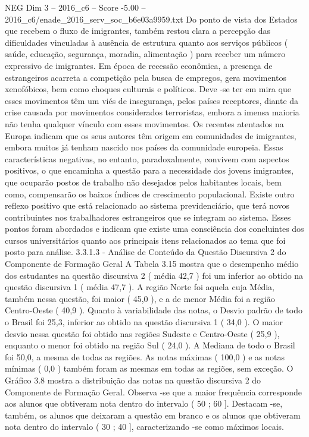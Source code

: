\begin{textsample}{NEG Dim 3 – 2016\_c6 – Score -5.00 – 2016\_c6/enade\_2016\_serv\_soc\_b6e03a9959.txt}
Do ponto de vista dos Estados que recebem o fluxo de imigrantes, também restou clara a percepção das dificuldades vinculadas à ausência de estrutura quanto aos serviços públicos ( saúde, educação, segurança, moradia, alimentação ) para receber um número expressivo de imigrantes.
Em época de recessão econômica, a presença de estrangeiros acarreta a competição pela busca de empregos, gera movimentos xenofóbicos, bem como choques culturais e políticos.
Deve -se ter em mira que esses movimentos têm um viés de insegurança, pelos países receptores, diante da crise causada por movimentos considerados terroristas, embora a imensa maioria não tenha qualquer vínculo com esses movimentos.
Os recentes atentados na Europa indicam que os seus autores têm origem em comunidades de imigrantes, embora muitos já tenham nascido nos países da comunidade europeia.
Essas características negativas, no entanto, paradoxalmente, convivem com aspectos positivos, o que encaminha a questão para a necessidade dos jovens imigrantes, que ocuparão postos de trabalho não desejados pelos habitantes locais, bem como, compensarão os baixos índices de crescimento populacional.
Existe outro reflexo positivo que está relacionado ao sistema previdenciário, que terá novos contribuintes nos trabalhadores estrangeiros que se integram ao sistema.
Esses pontos foram abordados e indicam que existe uma consciência dos concluintes dos cursos universitários quanto aos principais itens relacionados ao tema que foi posto para análise. 3.3.1.3 - Análise de Conteúdo da Questão Discursiva 2 do Componente de Formação Geral A Tabela 3.15 mostra que o desempenho médio dos estudantes na questão discursiva 2 ( média 42,7 ) foi um inferior ao obtido na questão discursiva 1 ( média 47,7 ).
A região Norte foi aquela cuja Média, também nessa questão, foi maior ( 45,0 ), e a de menor Média foi a região Centro-Oeste ( 40,9 ).
Quanto à variabilidade das notas, o Desvio padrão de todo o Brasil foi 25,3, inferior ao obtido na questão discursiva 1 ( 34,0 ).
O maior desvio nessa questão foi obtido nas regiões Sudeste e Centro-Oeste ( 25,9 ), enquanto o menor foi obtido na região Sul ( 24,0 ).
A Mediana de todo o Brasil foi 50,0, a mesma de todas as regiões.
As notas máximas ( 100,0 ) e as notas mínimas ( 0,0 ) também foram as mesmas em todas as regiões, sem exceção.
O Gráfico 3.8 mostra a distribuição das notas na questão discursiva 2 do Componente de Formação Geral.
Observa -se que a maior frequência corresponde aos alunos que obtiveram nota dentro do intervalo ( 50 ; 60 ].
Destacam -se, também, os alunos que deixaram a questão em branco e os alunos que obtiveram nota dentro do intervalo ( 30 ; 40 ], caracterizando -se como máximos locais.

\end{textsample}
